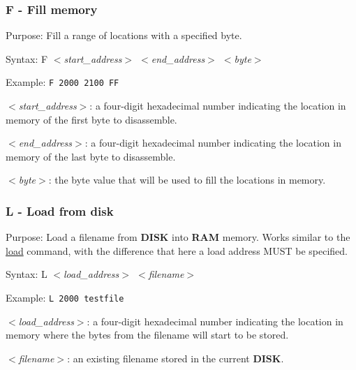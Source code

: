         \subsubsection{F - Fill memory}

        Purpose: Fill a range of locations with a specified byte.

        Syntax: F \textit{$<$start\_address$>$ $<$end\_address$>$ $<$byte$>$}

        Example: \texttt{F 2000 2100 FF}

        \hspace{1cm}\textit{$<$start\_address$>$}: a four-digit hexadecimal
        number indicating the location in memory of the first byte to
        disassemble.

        \hspace{1cm}\textit{$<$end\_address$>$}: a four-digit hexadecimal
        number indicating the location in memory of the last byte to
        disassemble.

        \hspace{1cm}\textit{$<$byte$>$}: the byte value that will be used to
        fill the locations in memory.

        \subsubsection{L - Load from disk}

        Purpose: Load a filename from \textbf{DISK} into \textbf{RAM} memory.
        Works similar to the \hyperref[cmd:load]{load} command, with the
        difference that here a load address MUST be specified.

        Syntax: L \textit{$<$load\_address$>$ $<$filename$>$}

        Example: \texttt{L 2000 testfile}

        \hspace{1cm}\textit{$<$load\_address$>$}: a four-digit hexadecimal
        number indicating the location in memory where the bytes from the
        filename will start to be stored.

        \hspace{1cm}\textit{$<$filename$>$}: an existing filename stored in the
        current \textbf{DISK}.

